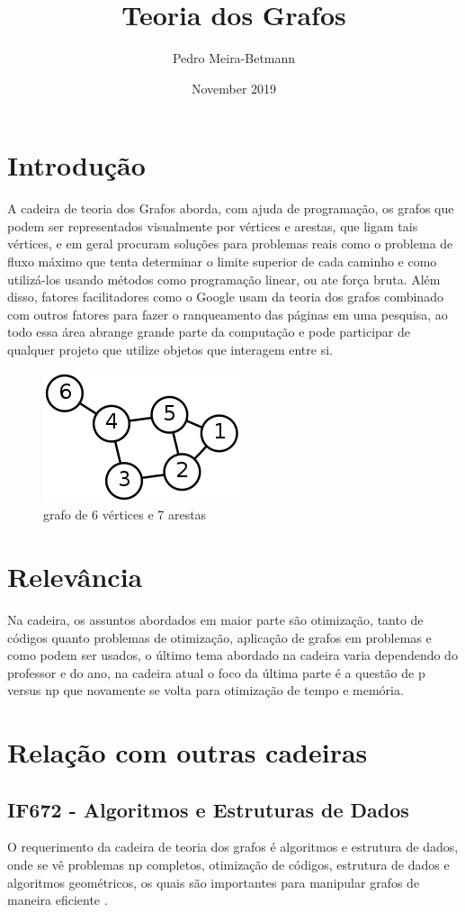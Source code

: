 \documentclass[10pt]{article}
\title{Teoria dos Grafos}
\author{Pedro Meira-Betmann}
\date{November 2019}
\begin{document}
\maketitle

\section{Introdução}
A cadeira de teoria dos Grafos aborda, com ajuda de programação, os grafos que podem ser representados visualmente por vértices e arestas, que ligam tais vértices, e em geral procuram soluções para problemas reais como o problema de fluxo máximo que tenta determinar o limite superior de cada caminho e como utilizá-los usando métodos como programação linear, ou ate força bruta. Além disso, fatores facilitadores como o Google usam da teoria dos grafos combinado com outros fatores para fazer o ranqueamento das páginas em uma pesquisa, ao todo essa área abrange grande parte da computação e pode participar de qualquer projeto que utilize objetos que interagem entre si.

\begin{figure}[h!]
\centering
\includegraphics[scale=1]{graph.jpg}
\caption{grafo de 6 vértices e 7 arestas \cite{wiki:xxx}}
\label{fig:graph}
\end{figure}
\section{Relevância}
Na cadeira, os assuntos abordados em maior parte são otimização, tanto de códigos quanto problemas de otimização, aplicação de grafos em problemas e como podem ser usados, o último tema abordado na cadeira varia dependendo do professor e do ano, na cadeira atual o foco da última parte é a questão de p versus np que novamente se volta para otimização de tempo e memória.
\section{Relação com outras cadeiras}
\subsection{IF672 - Algoritmos e Estruturas de Dados}
O requerimento da cadeira de teoria dos grafos é algoritmos e estrutura de dados, onde se vê problemas np completos, otimização de códigos, estrutura de dados e algoritmos geométricos, os quais são importantes para manipular grafos de maneira eficiente \cite{curriculo}.
\end{document}
